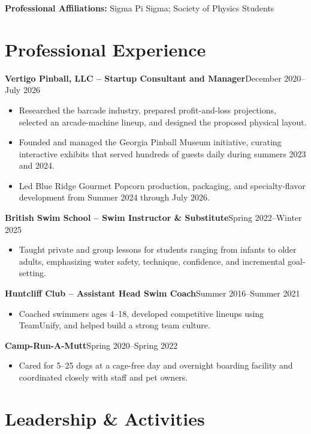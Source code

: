 \documentclass[10pt,a4paper]{article}
\newcommand{\entry}[2]{%
  \par\vspace{2pt}%
  \noindent\textbf{#1}\hfill#2\par
}
\newenvironment{items}
  {\begin{itemize}[leftmargin=1.2em,itemsep=0.6pt,topsep=1.5pt,parsep=0pt,
                   label=\textbullet]}
  {\end{itemize}}
\newcommand{\skill}[2]{\begingroup\sloppy\noindent\textbf{#1} #2\par\endgroup\vspace{1.5pt}}
\begin{document}
\skill{Professional Affiliations:}{Sigma Pi Sigma; Society of Physics Students}

\section{Professional Experience}

\entry{Vertigo Pinball, LLC -- Startup Consultant and Manager}{December 2020--July 2026}
\begin{items}
  \item Researched the barcade industry, prepared profit-and-loss projections, selected an
        arcade-machine lineup, and designed the proposed physical layout.
  \item Founded and managed the Georgia Pinball Museum initiative, curating interactive
        exhibits that served hundreds of guests daily during summers 2023 and 2024.
  \item Led Blue Ridge Gourmet Popcorn production, packaging, and specialty-flavor
        development from Summer 2024 through July 2026.
\end{items}

\entry{British Swim School -- Swim Instructor \& Substitute}{Spring 2022--Winter 2025}
\begin{items}
  \item Taught private and group lessons for students ranging from infants to older adults,
        emphasizing water safety, technique, confidence, and incremental goal-setting.
\end{items}

\entry{Huntcliff Club -- Assistant Head Swim Coach}{Summer 2016--Summer 2021}
\begin{items}
  \item Coached swimmers ages 4--18, developed competitive lineups using TeamUnify, and
        helped build a strong team culture.
\end{items}

\entry{Camp-Run-A-Mutt}{Spring 2020--Spring 2022}
\begin{items}
  \item Cared for 5--25 dogs at a cage-free day and overnight boarding facility and
        coordinated closely with staff and pet owners.
\end{items}

\section{Leadership \& Activities}
\end{document}
